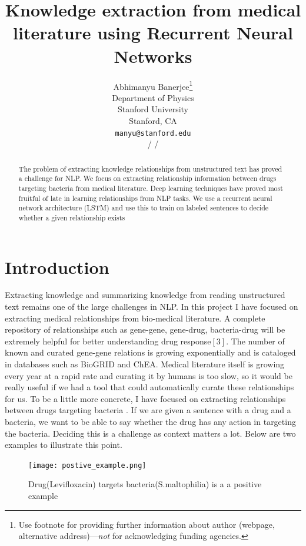 \documentclass{article} %
\title{Knowledge extraction from medical literature using Recurrent Neural Networks}
\author{
Abhimanyu Banerjee\thanks{ Use footnote for providing further information
about author (webpage, alternative address)---\emph{not} for acknowledging
funding agencies.} \\
Department of Physics\\
Stanford  University\\
Stanford, CA  \\
\texttt{manyu@stanford.edu} \\
/
/
}
\begin{document}
\maketitle

\begin{abstract}
The problem of extracting knowledge relationships from unstructured text has proved a challenge for NLP. 
We focus on extracting relationship information between drugs targeting bacteria from medical literature. Deep learning 
techniques have proved most fruitful of late in learning relationships from NLP tasks.
We use a recurrent neural network architecture (LSTM) and use this to train on labeled sentences to decide whether a given relationship exists

\end{abstract}

\section{Introduction}
Extracting knowledge and summarizing knowledge from reading unstructured text remains one of the large challenges in NLP. In this 
project I have focused on extracting medical relationships from bio-medical literature. A complete repository of relationships such as gene-gene, gene-drug, bacteria-drug will be extremely helpful for better understanding drug response$[3]$. The number of known and curated gene-gene relations is growing exponentially and is cataloged in databases such as BioGRID and ChEA. Medical literature itself is growing every year at a rapid rate and curating it by humans is too slow, so it would be really useful if we had a tool that could automatically curate these relationships for us. To be a little more concrete, I have focused on extracting relationships between drugs targeting bacteria . If we are given a sentence with a drug and a bacteria, we want to be able to say whether the drug has any action in targeting the bacteria. Deciding this is a 
challenge as context matters a lot. Below are two examples to illustrate this point.


\begin{figure}[h]
\begin{center}
\texttt{[image: postive\_example.png]}
\end{center}
\caption{Drug(Levifloxacin) targets bacteria(S.maltophilia) is a a positive example}
\end{figure}
\end{document}
